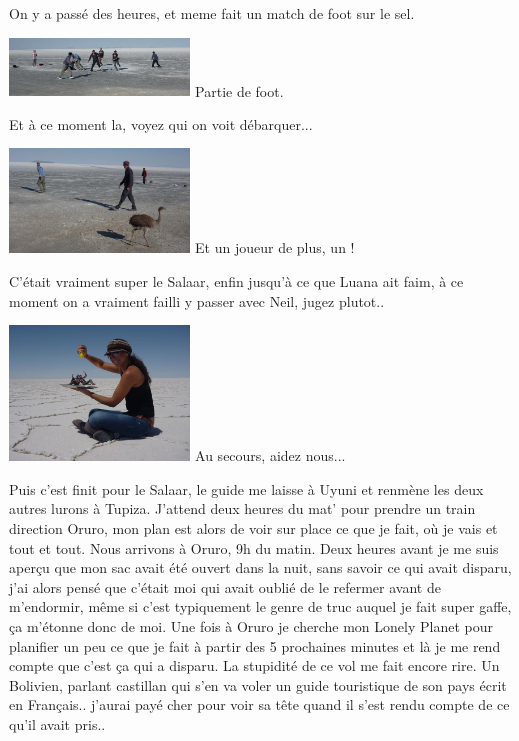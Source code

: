 \begin{multicols}{2}
On y a passé des heures, et meme fait un match de foot sur le sel.

\hspace*{-0.65cm}
\includegraphics[width=4.8cm]{articles/La-paz-humahuaca-et-salaar/12573870691BvG.jpg}
Partie de foot.

Et à ce moment la, voyez qui on voit débarquer...

\hspace*{-0.65cm}
\includegraphics[width=4.8cm]{articles/La-paz-humahuaca-et-salaar/1257387056akBO.jpg}
Et un joueur de plus, un !

C'était vraiment super le Salaar, enfin jusqu'à ce que Luana ait faim, à ce moment on a vraiment failli y passer avec Neil, jugez plutot..

\hspace*{-0.65cm}
\includegraphics[width=4.8cm]{articles/La-paz-humahuaca-et-salaar/12572036252qaK.jpg}
Au secours, aidez nous...

Puis c'est finit pour le Salaar, le guide me laisse à Uyuni et renmène les deux autres lurons à Tupiza. J'attend deux heures du mat' pour prendre un train direction Oruro, mon plan est alors de voir sur place ce que je fait, où je vais et tout et tout. Nous arrivons à Oruro, 9h du matin. Deux heures avant je me suis aperçu que mon sac avait été ouvert dans la nuit, sans savoir ce qui avait disparu, j'ai alors pensé que c'était moi qui avait oublié de le refermer avant de m'endormir, même si c'est typiquement le genre de truc auquel je fait super gaffe, ça m'étonne donc de moi. Une fois à Oruro je cherche mon Lonely Planet pour planifier un peu ce que je fait à partir des 5 prochaines minutes et là je me rend compte que c'est ça qui a disparu. La stupidité de ce vol me fait encore rire. Un Bolivien, parlant castillan qui s'en va voler un guide touristique de son pays écrit en Français.. j'aurai payé cher pour voir sa tête quand il s'est rendu compte de ce qu'il avait pris..


\end{multicols}
